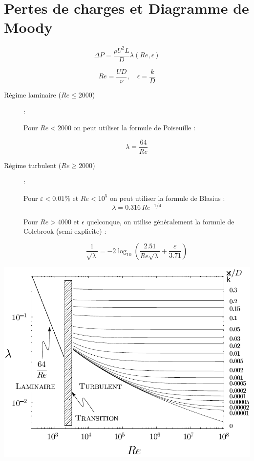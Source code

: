 













\clearpage
\section{Pertes de charges et Diagramme de Moody}
$$
\Delta P = \frac{\rho U^2 L}{D} \lambda(Re,\epsilon)
$$

$$ 
Re = \frac{U D}{\nu}, \quad \epsilon = \frac{k}{D}
$$

\begin{description}
\item[Régime laminaire ($Re \leq 2000$) ]:

Pour $Re < 2000$ on peut utiliser la formule de Poiseuille :

$$
\lambda = \frac{64}{Re}
$$
\item[Régime turbulent  ($Re \geq 2000$) ]:


Pour $\varepsilon < 0.01\%$ et $Re<10^5$ on peut utiliser  la formule de Blasius : 
\begin{equation}
   \lambda= 0.316 \, Re^{-1/4}
 \end{equation}

Pour $Re >4000$ et $\epsilon$ quelconque, on utilise généralement la formule de Colebrook (semi-explicite) :

\begin{equation}
  \frac{1}{\sqrt{\lambda}} = -2 \log_{10} \left (
  \frac{2.51}{Re\sqrt{\lambda}} + \frac{\varepsilon}{3.71}
  \right)
\end{equation}
\end{description}



\includegraphics[width=\linewidth]{../FIGURES/Moody_diagram.pdf}




